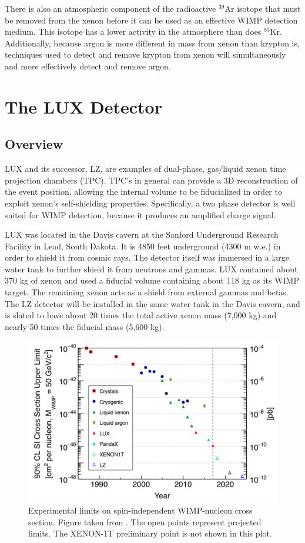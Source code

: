 There is also an atmospheric component of the radioactive $^{39}$Ar isotope that must be removed from the xenon before it can be used as an effective WIMP detection medium. This isotope has a lower activity in the atmosphere than does $^{85}$Kr. Additionally, because argon is more different in mass from xenon than krypton is, techniques used to detect and remove krypton from xenon will simultaneously and more effectively detect and remove argon.

\section{The LUX Detector}
\subsection{Overview}
LUX and its successor, LZ, are examples of dual-phase, gas/liquid xenon time projection chambers (TPC). TPC's in general can provide a 3D reconstruction of the event position, allowing the internal volume to be fiducialized in order to exploit xenon's self-shielding properties. Specifically, a two phase detector is well suited for WIMP detection, because it produces an amplified charge signal. 

LUX was located in the Davis cavern at the Sanford Underground Research Facility in Lead, South Dakota. It is 4850 feet underground (4300 m w.e.) in order to shield it from cosmic rays. The detector itself was immersed in a large water tank to further shield it from neutrons and gammas. LUX contained about 370 kg of xenon and used a fiducial volume containing about 118 kg as its WIMP target. The remaining xenon acts as a shield from external gammas and betas. The LZ detector will be installed in the same water tank in the Davis cavern, and is slated to have about 20 times the total active xenon mass (7,000 kg) and nearly 50 times the fiducial mass (5,600 kg).
\begin{figure}[h!]
\centering
\includegraphics[width=\linewidth]{Figures/limits_trend.png}
\caption{Experimental limits on spin-independent WIMP-nucleon cross section. Figure taken from \cite{lz_tdr}. The open points represent projected limits. The XENON-1T preliminary point is not shown in this plot.}
\label{fig:limits_trend} 
\end{figure}

